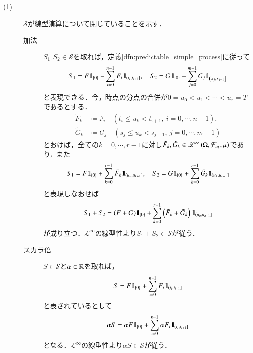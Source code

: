 	\begin{prf}\mbox{}
		\begin{description}
			\item[(1)] $\mathcal{S}$が線型演算について閉じていることを示す．
				\begin{description}
					\item[加法]
						$S_1,S_2 \in \mathcal{S}$を取れば，定義\ref{dfn:predictable_simple_process}に従って
						\begin{align}
							S_1 = F \mbox{1}\hspace{-0.25em}\mbox{l}_{\{0\}} + \sum_{i=0}^{n-1} F_i \mbox{1}\hspace{-0.25em}\mbox{l}_{\left(t_i,t_{i+1}\right]}, \quad
							S_2 = G \mbox{1}\hspace{-0.25em}\mbox{l}_{\{0\}} + \sum_{j=0}^{m-1} G_j \mbox{1}\hspace{-0.25em}\mbox{l}_{\left(s_j,s_{j+1}\right]}
						\end{align}
						と表現できる．今，時点の分点の合併が$0 = u_0 < u_1 < \cdots < u_r = T$であるとする．
						\begin{align}
							\tilde{F}_k &\coloneqq F_i \quad (t_i \leq u_k < t_{i+1},\ i=0,\cdots,n-1), \\
							\tilde{G}_k &\coloneqq G_j \quad (s_j \leq u_k < s_{j+1},\ j=0,\cdots,m-1)
						\end{align}
						とおけば，全ての$k = 0,\cdots,r-1$に対し$\tilde{F}_k,\tilde{G}_k \in \mathscr{L}^{\infty} \left(\Omega,\mathcal{F}_{u_k},\mu\right)$であり，また
						\begin{align}
							S_1 = F \mbox{1}\hspace{-0.25em}\mbox{l}_{\{0\}} + \sum_{k=0}^{r-1} \tilde{F}_k \mbox{1}\hspace{-0.25em}\mbox{l}_{\left(u_k,u_{k+1}\right]}, \quad
							S_2 = G \mbox{1}\hspace{-0.25em}\mbox{l}_{\{0\}} + \sum_{k=0}^{r-1} \tilde{G}_k \mbox{1}\hspace{-0.25em}\mbox{l}_{\left(u_k,u_{k+1}\right]}
						\end{align}
						と表現しなおせば
						\begin{align}
							S_1 + S_2 = (F+G) \mbox{1}\hspace{-0.25em}\mbox{l}_{\{0\}} + \sum_{k=0}^{r-1} \left( \tilde{F}_k + \tilde{G}_k \right) \mbox{1}\hspace{-0.25em}\mbox{l}_{\left(u_k,u_{k+1}\right]}
							\label{eq:lem_properties_of_simple_predictable_processes}
						\end{align}
						が成り立つ．$\mathscr{L}^{\infty}$の線型性より$S_1 + S_2 \in \mathcal{S}$が従う．
						
					\item[スカラ倍]
						$S \in \mathcal{S}$と$\alpha \in \mathbb{R}$を取れば，
						\begin{align}
							S = F \mbox{1}\hspace{-0.25em}\mbox{l}_{\{0\}} + \sum_{i=0}^{n-1} F_i \mbox{1}\hspace{-0.25em}\mbox{l}_{\left(t_i,t_{i+1}\right]}
						\end{align}
						と表されているとして
						\begin{align}
							\alpha S = \alpha F \mbox{1}\hspace{-0.25em}\mbox{l}_{\{0\}} + \sum_{i=0}^{n-1} \alpha F_i \mbox{1}\hspace{-0.25em}\mbox{l}_{\left(t_i,t_{i+1}\right]}
						\end{align}
						となる．$\mathscr{L}^{\infty}$の線型性より$\alpha S \in \mathcal{S}$が従う．
				\end{description}
				

\end{description}
\end{prf}
